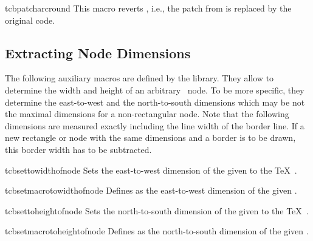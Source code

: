 \begin{docCommand}[doc new=2014-05-05]{tcbpatcharcround}{}
This macro reverts , i.e., the patch from
 is replaced by the original code.
\end{docCommand}


\clearpage
\subsection{Extracting Node Dimensions}
The following auxiliary macros are defined by the  library.
They allow to determine the width and height of an arbitrary \tikzname\ node.
To be more specific, they determine the east-to-west and the north-to-south dimensions
which may be not the maximal dimensions for a non-rectangular node.
Note that the following dimensions are measured exactly including the line width
of the border line. If a new rectangle or node with the same dimensions
and a border is to be drawn, this border width has to be subtracted.

\begin{docCommand}[doc new=2014-09-19]{tcbsettowidthofnode}{}
  Sets the east-to-west dimension of the given 
  to the \TeX\ .
\end{docCommand}

\begin{docCommand}[doc new=2014-09-19]{tcbsetmacrotowidthofnode}{}
  Defines  as the east-to-west dimension of the given .
\end{docCommand}

\begin{docCommand}[doc new=2014-09-19]{tcbsettoheightofnode}{}
  Sets the north-to-south dimension of the given 
  to the \TeX\ .
\end{docCommand}

\begin{docCommand}[doc new=2014-09-19]{tcbsetmacrotoheightofnode}{}
  Defines  as the north-to-south dimension of the given .
\end{docCommand}

\begin{dispExample}
\end{dispExample}


